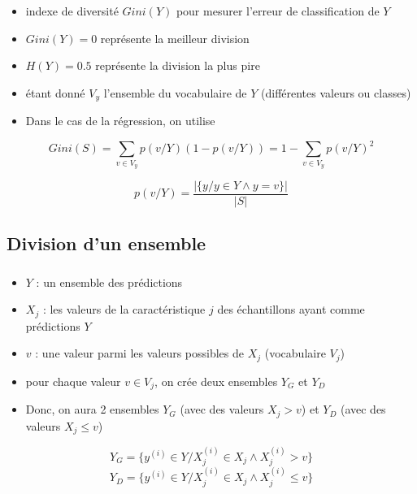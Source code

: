 \documentclass[xcolor=table]{beamer}
\begin{document}
\begin{frame}
	\frametitle{\insertsection}
	\framesubtitle{\insertsubsection}
	
	\begin{itemize}
		\item indexe de diversité $Gini(Y)$ pour mesurer l'erreur de classification de $Y$
		\item $Gini(Y)=0$ représente la meilleur division
		\item $H(Y)=0.5$ représente la division la plus pire
		\item étant donné $V_y$ l'ensemble du vocabulaire de $Y$ (différentes valeurs ou classes)
		\item Dans le cas de la régression, on utilise 
	\end{itemize}
	
	\[Gini(S) = \sum\limits_{v \in V_y} p(v/Y) (1-p(v/Y)) = 1 - \sum\limits_{v \in V_y} p(v/Y)^2 \]
	
	\[p(v/Y) = \frac{|\{y / y \in Y \wedge y = v\}|}{|S|}\]
	
\end{frame}

\subsection{Division d'un ensemble}

\begin{frame}
	\frametitle{\insertsection}
	\framesubtitle{\insertsubsection}
	
	\begin{itemize}
		\item $Y$ : un ensemble des prédictions 
		\item $X_j$ : les valeurs de la caractéristique $j$ des échantillons ayant comme prédictions $Y$
		\item $v$ : une valeur parmi les valeurs possibles de $X_j$ (vocabulaire $V_j$)
		\item pour chaque valeur $v \in V_j$, on crée deux ensembles $Y_G$ et $Y_D$
		\item Donc, on aura 2 ensembles $Y_G$ (avec des valeurs $X_j > v$) et $Y_D$ (avec des valeurs $X_j \le v$)
	\end{itemize}
	
	\[Y_G = \{y^{(i)} \in Y / X_j^{(i)} \in X_j \wedge X_j^{(i)} > v\}\]
	\[Y_D = \{y^{(i)} \in Y / X_j^{(i)} \in X_j \wedge X_j^{(i)} \le v\}\]
	
\end{frame}
\end{document}
